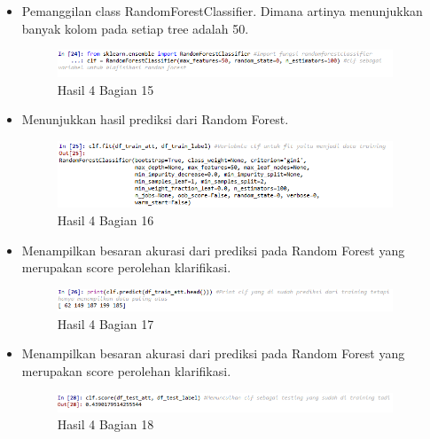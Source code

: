 \begin{itemize}
\item Pemanggilan class RandomForestClassifier. Dimana artinya menunjukkan banyak kolom pada setiap tree adalah 50.

\begin{figure}[H]
\centerline{\includegraphics[width=10cm]{figures/1174077/3/21.png}}
\caption{Hasil 4 Bagian 15}
\label{labelgambar}
\end{figure}

\item Menunjukkan hasil prediksi dari Random Forest.

\begin{figure}[H]
\centerline{\includegraphics[width=10cm]{figures/1174077/3/22.png}}
\caption{Hasil 4 Bagian 16}
\label{labelgambar}
\end{figure}

\item Menampilkan besaran akurasi dari prediksi pada Random Forest yang merupakan score perolehan klarifikasi.

\begin{figure}[H]
\centerline{\includegraphics[width=10cm]{figures/1174077/3/23.png}}
\caption{Hasil 4 Bagian 17}
\label{labelgambar}
\end{figure}

\item Menampilkan besaran akurasi dari prediksi pada Random Forest yang merupakan score perolehan klarifikasi.

\begin{figure}[H]
\centerline{\includegraphics[width=10cm]{figures/1174077/3/24.png}}
\caption{Hasil 4 Bagian 18}
\label{labelgambar}
\end{figure}
\end{itemize}

